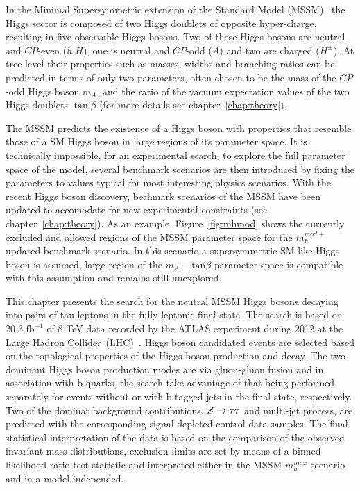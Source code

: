 In the Minimal Supersymmetric extension of the Standard Model
(MSSM)~\cite{MSSM1, MSSM2} the Higgs sector is composed of two Higgs
doublets of opposite hyper-charge, resulting in five observable Higgs
bosons.  Two of these Higgs bosons are neutral and $CP$-even
($h$,$H$), one is neutral and $CP$-odd ($A$) and two are charged
($H^\pm$).  At tree level their properties such as masses, widths and
branching ratios can be predicted in terms of only two parameters,
often chosen to be the mass of the $CP$-odd Higgs boson $m_A$, and
the ratio of the vacuum expectation values of the two Higgs doublets
$\tan\beta$ (for more details see chapter~\ref{chap:theory}).  

The MSSM predicts the existence of a Higgs boson with properties that  
resemble those of a SM Higgs boson in large regions of its parameter space. It is technically impossible,
for an experimental  search, to explore the full parameter space of the model, several benchmark scenarios are then 
introduced by fixing the parameters to values typical for most interesting physics scenarios.
With the recent Higgs boson discovery, bechmark scenarios of the MSSM have been updated to 
accomodate for  new experimental constraints (see chapter~\ref{chap:theory}). 
As an example, Figure~\ref{fig:mhmod} shows the currently excluded and allowed regions of the MSSM parameter space
for the  $m_{h}^{mod+}$ updated benchmark scenario. In this scenario a supersymmetric SM-like Higgs boson is assumed, 
large region of the $m_{A} - \text{tan}\beta$ parameter space is compatible with this assumption and remains still unexplored.


This chapter presents the search for the neutral MSSM Higgs bosons decaying into pairs of tau leptons
in the fully leptonic final state. The search is based on 20.3 $\text{fb}^{-1}$ of 8 TeV data 
recorded by the ATLAS experiment during 2012 at the Large Hadron Collider~(LHC)~\cite{LHC}.
Higgs boson candidated events are selected based on the topological properties of the Higgs boson production 
and decay. The two dominant Higgs boson production modes are via gluon-gluon fusion and in association with b-quarks,
the search take advantage of that being performed separately for events without or with b-tagged jets in the final state,
respectively. Two of the dominat background contributions, $Z\rightarrow \tau\tau$ and multi-jet process, are predicted with 
the corresponding signal-depleted control data samples. The final statistical interpretation of the data is based on the 
comparison of the observed invariant mass distributions, exclusion limits are set by means of a binned likelihood ratio
test statistic and interpreted either in the MSSM $m_{h}^{max}$ scenario and in a model independed.

